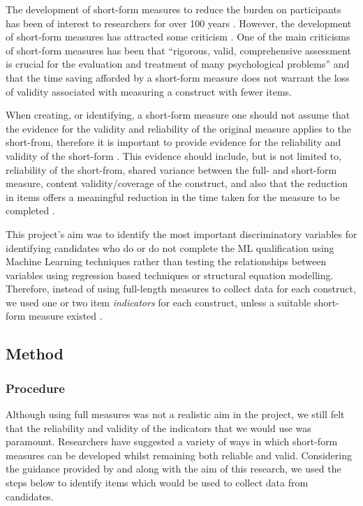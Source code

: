 \documentclass[a4paper,]{book}
\begin{document}
The development of short-form measures to reduce the burden on participants has been of interest to researchers for over 100 years \citep{Smith2000}. However, the development of short-form measures has attracted some criticism \citep[e.g.,][]{Levy1968, Smith2000, Wechsler1967}. One of the main criticisms of short-form measures has been that ``rigorous, valid, comprehensive assessment is crucial for the evaluation and treatment of many psychological problems'' \citep[p 102]{Smith2000} and that the time saving afforded by a short-form measure does not warrant the loss of validity associated with measuring a construct with fewer items.

When creating, or identifying, a short-form measure one should not assume that the evidence for the validity and reliability of the original measure applies to the short-from, therefore it is important to provide evidence for the reliability and validity of the short-form \citep{Smith2000}. This evidence should include, but is not limited to, reliability of the short-from, shared variance between the full- and short-form measure, content validity/coverage of the construct, and also that the reduction in items offers a meaningful reduction in the time taken for the measure to be completed \citep{Horvath2018, Smith2000}.

This project's aim was to identify the most important discriminatory variables for identifying candidates who do or do not complete the ML qualification using Machine Learning techniques rather than testing the relationships between variables using regression based techniques or structural equation modelling. Therefore, instead of using full-length measures to collect data for each construct, we used one or two item \emph{indicators} for each construct, unless a suitable short-form measure existed \citep[e.g., the Ten Item Personality Inventory][]{Gosling2003}.

\hypertarget{method-1}{%
\subsection{Method}\label{method-1}}

\hypertarget{procedure-1}{%
\subsubsection{Procedure}\label{procedure-1}}

Although using full measures was not a realistic aim in the project, we still felt that the reliability and validity of the indicators that we would use was paramount. Researchers have suggested a variety of ways in which short-form measures can be developed whilst remaining both reliable and valid. Considering the guidance provided by \citet{Smith2000} and \citet{Horvath2018} along with the aim of this research, we used the steps below to identify items which would be used to collect data from candidates.
\end{document}
